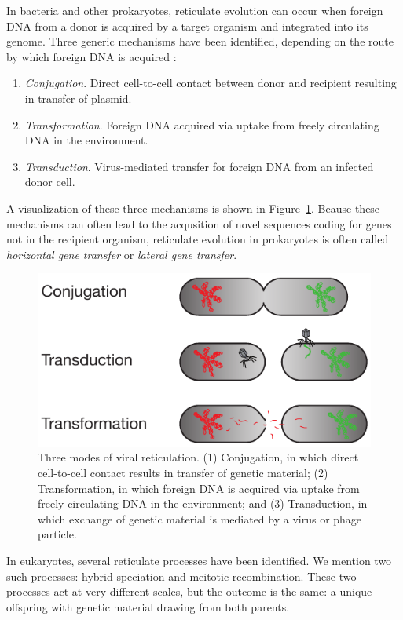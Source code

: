 In bacteria and other prokaryotes, reticulate evolution can occur when foreign DNA from a donor is acquired by a target organism and integrated into its genome.
Three generic mechanisms have been identified, depending on the route by which foreign DNA is acquired \cite{Ochman:2000dr}:
\begin{enumerate}
\item \emph{Conjugation}. Direct cell-to-cell contact between donor and recipient resulting in transfer of plasmid.
\item \emph{Transformation}. Foreign DNA acquired via uptake from freely circulating DNA in the environment.
\item \emph{Transduction}. Virus-mediated transfer for foreign DNA from an infected donor cell.
\end{enumerate}
A visualization of these three mechanisms is shown in Figure~\ref{fig:bacterial_reticulation}.
Beause these mechanisms can often lead to the acqusition of novel sequences coding for genes not in the recipient organism, reticulate evolution in prokaryotes is often called \emph{horizontal gene transfer} or \emph{lateral gene transfer}.

\begin{figure}
\centering
\includegraphics[]{./fig/background/bacterial_reticulation.pdf}
\caption[Three modes of bacterial reticulation]{Three modes of viral reticulation. (1) Conjugation, in which direct cell-to-cell contact results in transfer of genetic material; (2) Transformation, in which foreign DNA is acquired via uptake from freely circulating DNA in the environment; and (3) Transduction, in which exchange of genetic material is mediated by a virus or phage particle.}
\label{fig:bacterial_reticulation}
\end{figure}

In eukaryotes, several reticulate processes have been identified.
We mention two such processes: hybrid speciation and meitotic recombination.
These two processes act at very different scales, but the outcome is the same: a unique offspring with genetic material drawing from both parents.

